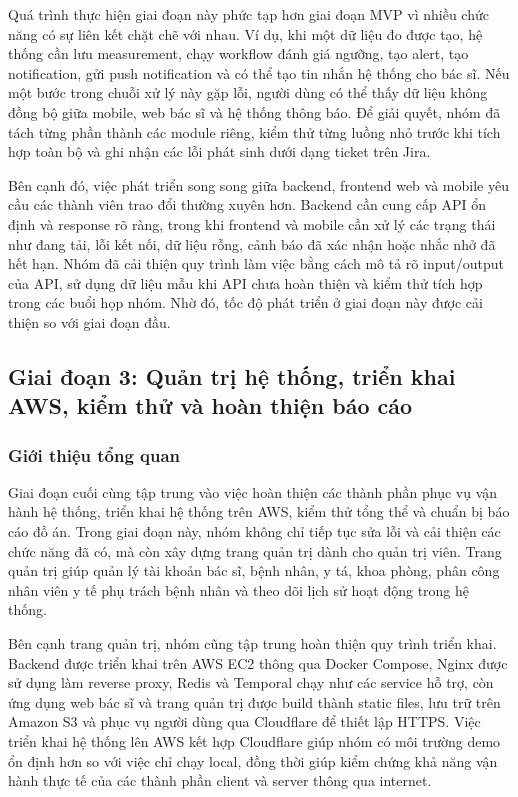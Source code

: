 \par Quá trình thực hiện giai đoạn này phức tạp hơn giai đoạn MVP vì nhiều chức năng có sự liên kết chặt chẽ với nhau. Ví dụ, khi một dữ liệu đo được tạo, hệ thống cần lưu measurement, chạy workflow đánh giá ngưỡng, tạo alert, tạo notification, gửi push notification và có thể tạo tin nhắn hệ thống cho bác sĩ. Nếu một bước trong chuỗi xử lý này gặp lỗi, người dùng có thể thấy dữ liệu không đồng bộ giữa mobile, web bác sĩ và hệ thống thông báo. Để giải quyết, nhóm đã tách từng phần thành các module riêng, kiểm thử từng luồng nhỏ trước khi tích hợp toàn bộ và ghi nhận các lỗi phát sinh dưới dạng ticket trên Jira.

\par Bên cạnh đó, việc phát triển song song giữa backend, frontend web và mobile yêu cầu các thành viên trao đổi thường xuyên hơn. Backend cần cung cấp API ổn định và response rõ ràng, trong khi frontend và mobile cần xử lý các trạng thái như đang tải, lỗi kết nối, dữ liệu rỗng, cảnh báo đã xác nhận hoặc nhắc nhở đã hết hạn. Nhóm đã cải thiện quy trình làm việc bằng cách mô tả rõ input/output của API, sử dụng dữ liệu mẫu khi API chưa hoàn thiện và kiểm thử tích hợp trong các buổi họp nhóm. Nhờ đó, tốc độ phát triển ở giai đoạn này được cải thiện so với giai đoạn đầu.

\subsection{Giai đoạn 3: Quản trị hệ thống, triển khai AWS, kiểm thử và hoàn thiện báo cáo}

\subsubsection{Giới thiệu tổng quan}
\par Giai đoạn cuối cùng tập trung vào việc hoàn thiện các thành phần phục vụ vận hành hệ thống, triển khai hệ thống trên AWS, kiểm thử tổng thể và chuẩn bị báo cáo đồ án. Trong giai đoạn này, nhóm không chỉ tiếp tục sửa lỗi và cải thiện các chức năng đã có, mà còn xây dựng trang quản trị dành cho quản trị viên. Trang quản trị giúp quản lý tài khoản bác sĩ, bệnh nhân, y tá, khoa phòng, phân công nhân viên y tế phụ trách bệnh nhân và theo dõi lịch sử hoạt động trong hệ thống.

\par Bên cạnh trang quản trị, nhóm cũng tập trung hoàn thiện quy trình triển khai. Backend được triển khai trên AWS EC2 thông qua Docker Compose, Nginx được sử dụng làm reverse proxy, Redis và Temporal chạy như các service hỗ trợ, còn ứng dụng web bác sĩ và trang quản trị được build thành static files, lưu trữ trên Amazon S3 và phục vụ người dùng qua Cloudflare để thiết lập HTTPS. Việc triển khai hệ thống lên AWS kết hợp Cloudflare giúp nhóm có môi trường demo ổn định hơn so với việc chỉ chạy local, đồng thời giúp kiểm chứng khả năng vận hành thực tế của các thành phần client và server thông qua internet.

